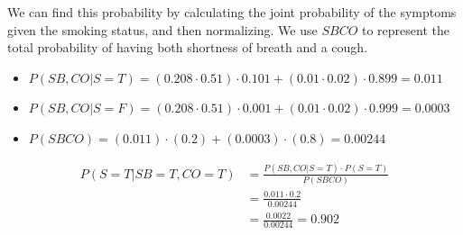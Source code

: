 \documentclass[12pt,a4paper]{article}
\begin{document}
We can find this probability by calculating the joint probability of the symptoms given the smoking status, and then normalizing. We use $SBCO$ to represent the total probability of having both shortness of breath and a cough.

\begin{itemize}
    \item $P(SB, CO | S=T) = (0.208 \cdot 0.51) \cdot 0.101 + (0.01 \cdot 0.02) \cdot 0.899 = 0.011$
    \item $P(SB, CO | S=F) = (0.208 \cdot 0.51) \cdot 0.001 + (0.01 \cdot 0.02) \cdot 0.999 = 0.0003$
    \item $P(SBCO) = (0.011) \cdot (0.2) + (0.0003) \cdot (0.8) = 0.00244$
\end{itemize}

\begin{align*}
P(S=T | SB=T, CO=T) &= \frac{P(SB, CO | S=T) \cdot P(S=T)}{P(SBCO)} \\
&= \frac{0.011 \cdot 0.2}{0.00244} \\
&= \frac{0.0022}{0.00244} = {0.902}
\end{align*}
\end{document}
